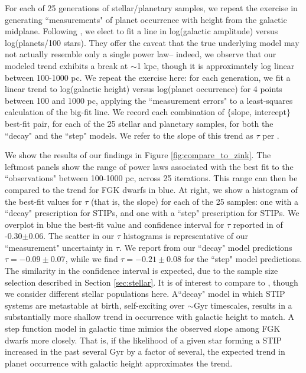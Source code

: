 \documentclass[twocolumn]{aastex631}
\begin{document}
For each of 25 generations of stellar/planetary samples, we repeat the exercise in generating ``measurements" of planet occurrence with height from the galactic midplane. Following \cite{zink_scaling_2023}, we elect to fit a line in log(galactic amplitude) versus log(planets/100 stars). They offer the caveat that the true underlying model may not actually resemble only a single power law-- indeed, we observe that our modeled trend exhibits a break at $\sim$1 kpc, though it is approximately log linear between 100-1000 pc. We repeat the exercise here: for each generation, we fit a linear trend to log(galactic height) versus log(planet occurrence) for 4 points between 100 and 1000 pc, applying the ``measurement errors" to a least-squares calculation of the big-fit line. We record each combination of $\{$slope, intercept$\}$ best-fit pair, for each of the 25 stellar and planetary samples, for both the ``decay" and the ``step" models. We refer to the slope of this trend as $\tau$ per \cite{zink_scaling_2023}. 

We show the results of our findings in Figure \ref{fig:compare_to_zink}. The leftmost panels show the range of power laws associated with the best fit to the ``observations" between 100-1000 pc, across 25 iterations. This range can then be compared to the \cite{zink_scaling_2023} trend for FGK dwarfs in blue. At right, we show a histogram of the best-fit values for $\tau$ (that is, the slope) for each of the 25 samples: one with a ``decay" prescription for STIPs, and one with a ``step" prescription for STIPs. We overplot in blue the best-fit value and confidence interval for $\tau$ reported in \cite{zink_scaling_2023} of -0.30$\pm$0.06. The scatter in our $\tau$ histograms is representative of our ``measurement" uncertainty in $\tau$. We report from our ``decay" model predictions $\tau=-0.09\pm0.07$, while we find $\tau=-0.21\pm0.08$ for the ``step" model predictions. The similarity in the confidence interval is expected, due to the sample size selection described in Section \ref{sec:stellar}. It is of interest to compare to \cite{zink_scaling_2023}, though we consider different stellar populations here. A``decay" model in which STIP systems are metastable at birth, self-exciting over $\sim$Gyr timescales, results in a substantially more shallow trend in occurrence with galactic height to match.  A step function model in galactic time mimics the observed slope among FGK dwarfs more closely. That is, if the likelihood of a given star forming a STIP increased in the past several Gyr by a factor of several, the expected trend in planet occurrence with galactic height approximates the \cite{zink_scaling_2023} trend. 
\end{document}
